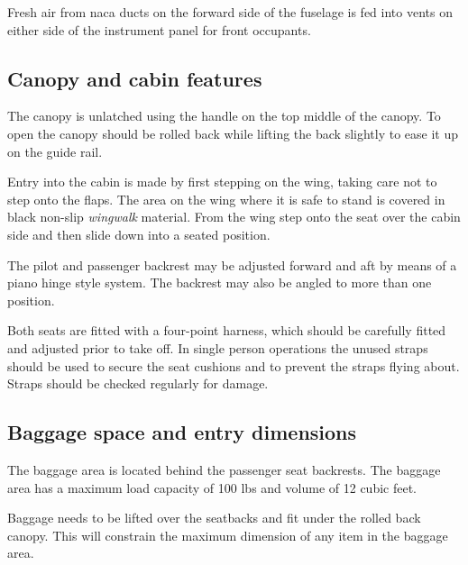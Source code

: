 Fresh air from naca ducts on the forward side of the fuselage is fed into vents on either side of the instrument
panel for front occupants.


\subsection{Canopy and cabin features}
The canopy is unlatched using the handle on the top middle of the canopy.  To open the canopy should be rolled back while lifting the back slightly to ease it up on the guide rail.  

Entry into the cabin is made by first stepping on the wing, taking care not to step onto the flaps.  The area on the wing where it is safe to stand is covered in black non-slip \textit{wingwalk} material.  From the wing step onto the seat over the cabin side and then slide down into a seated position.

The pilot and passenger backrest may be adjusted forward and aft by means of a piano hinge style system.  The backrest may also be angled to more than one position. 

Both seats are fitted with a four-point harness, which should be carefully fitted and adjusted prior to take off. In single person operations the unused straps should be used to secure the seat cushions and to prevent the straps flying about.
Straps should be checked regularly for damage.

\subsection{Baggage space and entry dimensions}
The baggage area is located behind the passenger seat backrests.  The baggage area has a maximum load capacity of 100 lbs and volume of 12 cubic feet.  

 Baggage needs to be lifted over the seatbacks and fit under the rolled back canopy.  This will constrain the maximum dimension of any item in the baggage area.


